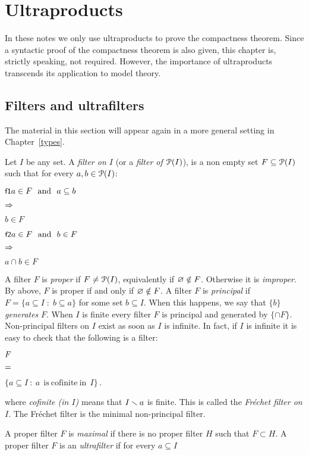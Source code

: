 \documentclass[creche.tex]{subfiles}
\begin{document}
\chapter{Ultraproducts}
\label{ultraprodotti}

\def\medrel#1{\parbox[t]{6ex}{$\displaystyle\hfil #1$}}
\def\ceq#1#2#3{\parbox[b]{25ex}{$\displaystyle #1$}\medrel{#2}$\displaystyle  #3$}

In these notes we only use ultraproducts to prove the compactness theorem. Since a syntactic proof of the compactness theorem is also given, this chapter is, strictly speaking, not required. However, the importance of ultraproducts transcends its application to model theory.


\section{Filters and ultrafilters}\label{ultrafiltri}

The material in this section will appear again in a more general setting in Chapter~\ref{types}.

Let $I$ be any set. A \emph{filter on $I$\/} (or a \emph{filter of $\P(I)$}), is a non empty set $F\subseteq \P(I)$ such that for every $a, b\in \P(I)$:

\ceq{\ssf{f1}\hfill a\in F\ \ \textrm{and}\ \ a\subseteq b}{\IMP}{b\in F}

\ceq{\ssf{f2}\hfill a\in F\ \ \textrm{and}\ \ b\in F}{\IMP}{a\cap b\in F}

A filter $F$ is \emph{proper\/} if $F\neq\P(I)$, equivalently if $\0\notin F$. Otherwise it is \emph{improper}. By  above, $F$ is proper if and only if $\0\notin F$. A filter $F$ is \emph{principal\/} if $F=\{a\subseteq I\; :\; b\subseteq a\}$ for some set $b\subseteq I$. When this happens, we say that $\{b\}$ \emph{generates\/} $F$. When $I$ is finite every filter $F$ is principal and generated by $\{\cap F\}$. Non-principal filters on $I$ exist as soon as $I$ is infinite. In fact, if $I$ is infinite it is easy to check that the following is a filter:

\ceq{\hfill F}{=}{\Big\{a\subseteq I\ :\ a \ \mathrm{\ is\ cofinite\ in\ }\ I\Big\}\, .}

where \emph{cofinite (in $I$)} means that $I\sm a$ is finite. This is called the \emph{Fr\'echet filter on $I$}. The Fr\'echet filter is the minimal non-principal filter.

A proper filter $F$ is \emph{maximal\/} if there is no proper filter $H$ such that $F\subset H$. A proper filter $F$ is an \emph{ultrafilter\/} if for every $a\subseteq I$
\end{document}
